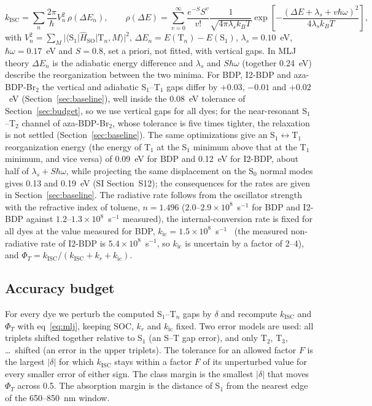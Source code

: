 \documentclass[journal=jctcce,manuscript=article]{achemso}
\newcommand{\kisc}{k_\mathrm{ISC}}
\newcommand{\Hso}{\hat H_\mathrm{SO}}
\begin{document}
\begin{equation}
  \kisc = \sum_n \frac{2\pi}{\hbar} V_n^2\,\rho(\Delta E_n),\qquad
  \rho(\Delta E) = \sum_{v=0}^{\infty} \frac{e^{-S}S^v}{v!}
  \frac{1}{\sqrt{4\pi\lambda_s k_BT}}
  \exp\!\left[-\frac{(\Delta E + \lambda_s + v\hbar\omega)^2}{4\lambda_s k_BT}\right],
  \label{eq:mlj}
\end{equation}
with $V_n^2=\sum_M\lvert\langle\mathrm{S}_1\rvert\Hso\lvert\mathrm{T}_n,M\rangle\rvert^2$,
$\Delta E_n=E(\mathrm{T}_n)-E(\mathrm{S}_1)$, $\lambda_s=0.10$~eV, $\hbar\omega=0.17$~eV and $S=0.8$,
set a priori, not fitted, with vertical gaps. In MLJ theory $\Delta E_n$ is the adiabatic energy difference
and $\lambda_s$ and $S\hbar\omega$ (together 0.24~eV) describe the reorganization between the two minima. For BDP,
I2-BDP and aza-BDP-Br$_2$ the vertical and adiabatic S$_1$--T$_1$ gaps differ by $+0.03$, $-0.01$ and $+0.02$~eV
(Section~\ref{sec:baseline}), well inside the 0.08~eV tolerance of Section~\ref{sec:budget}, so we use vertical gaps for
all dyes; for the near-resonant S$_1$--T$_2$ channel of aza-BDP-Br$_2$, whose tolerance is five times tighter, the
relaxation is not settled (Section~\ref{sec:baseline}). The same optimizations give an S$_1\leftrightarrow$T$_1$ reorganization energy (the energy of T$_1$ at
the S$_1$ minimum above that at the T$_1$ minimum, and vice versa) of 0.09~eV for BDP and 0.12~eV for I2-BDP, about
half of $\lambda_s+S\hbar\omega$, while projecting the same displacement on the S$_0$ normal modes gives 0.13 and
0.19~eV (SI Section~S12); the consequences for the rates are given in Section~\ref{sec:baseline}. The radiative rate follows from the oscillator
strength~\cite{Strickler1962} with the refractive index of toluene, $n=1.496$ ($2.0$--$2.9\times10^{8}$~s$^{-1}$ for BDP and I2-BDP against
$1.2$--$1.3\times10^{8}$~s$^{-1}$ measured), the internal-conversion rate is fixed for all dyes at the value measured for
BDP, $k_\mathrm{ic}=1.5\times10^{8}$~s$^{-1}$~\cite{Ly2021} (the measured non-radiative rate of I2-BDP is
$5.4\times10^{8}$~s$^{-1}$, so $k_\mathrm{ic}$ is uncertain by a factor of 2--4), and
$\Phi_T=\kisc/(\kisc+k_r+k_\mathrm{ic})$.

\subsection{Accuracy budget}
\label{sec:budget-method}

For every dye we perturb the computed S$_1$--T$_n$ gaps by $\delta$ and recompute $\kisc$ and $\Phi_T$
with eq~\ref{eq:mlj}, keeping SOC, $k_r$ and $k_\mathrm{ic}$ fixed. Two error models are used: all
triplets shifted together relative to S$_1$ (an S--T gap error), and only T$_2$, T$_3$, \dots\ shifted
(an error in the upper triplets). The tolerance for an allowed factor $F$ is the largest $\lvert\delta\rvert$
for which $\kisc$ stays within a factor $F$ of its unperturbed value for every smaller error of either
sign. The class margin is the smallest $\lvert\delta\rvert$ that moves $\Phi_T$ across 0.5. The
absorption margin is the distance of S$_1$ from the nearest edge of the 650--850~nm window.
\end{document}
